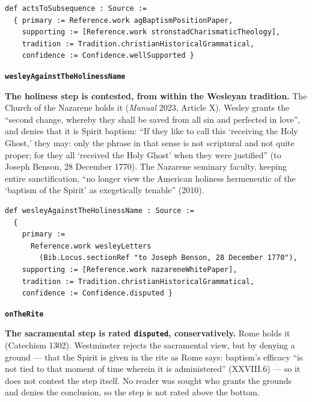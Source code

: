 \documentclass[11pt]{article}
\begin{document}
{\small\begin{verbatim}
def actsToSubsequence : Source :=
  { primary := Reference.work agBaptismPositionPaper,
    supporting := [Reference.work stronstadCharismaticTheology],
    tradition := Tradition.christianHistoricalGrammatical,
    confidence := Confidence.wellSupported }
\end{verbatim}}
\par\medskip\noindent\textbf{\texttt{wesley\allowbreak{}Against\allowbreak{}The\allowbreak{}Holiness\allowbreak{}Name}}\par\nobreak\noindent
\textbf{The holiness step is contested, from within the Wesleyan tradition.} The Church of the Nazarene holds it (\emph{Manual} 2023, Article X). Wesley grants the “second change, whereby they shall be saved from all sin and perfected in love”, and denies that it is Spirit baptism: “If they like to call this ‘receiving the Holy Ghost,’ they may: only the phrase in that sense is not scriptural and not quite proper; for they all ‘received the Holy Ghost’ when they were justified” (to Joseph Benson, 28 December 1770). The Nazarene seminary faculty, keeping entire sanctification, “no longer view the American holiness hermeneutic of the ‘baptism of the Spirit’ as exegetically tenable” (2010).

{\small\begin{verbatim}
def wesleyAgainstTheHolinessName : Source :=
  {
    primary :=
      Reference.work wesleyLetters
        (Bib.Locus.sectionRef "to Joseph Benson, 28 December 1770"),
    supporting := [Reference.work nazareneWhitePaper],
    tradition := Tradition.christianHistoricalGrammatical,
    confidence := Confidence.disputed }
\end{verbatim}}
\par\medskip\noindent\textbf{\texttt{on\allowbreak{}The\allowbreak{}Rite}}\par\nobreak\noindent
\textbf{The sacramental step is rated \texttt{disputed}, conservatively.} Rome holds it (Catechism 1302). Westminster rejects the sacramental view, but by denying a ground — that the Spirit is given in the rite as Rome says: baptism’s efficacy “is not tied to that moment of time wherein it is administered” (XXVIII.6) — so it does not contest the step itself. No reader was sought who grants the grounds and denies the conclusion, so the step is not rated above the bottom.
\end{document}
